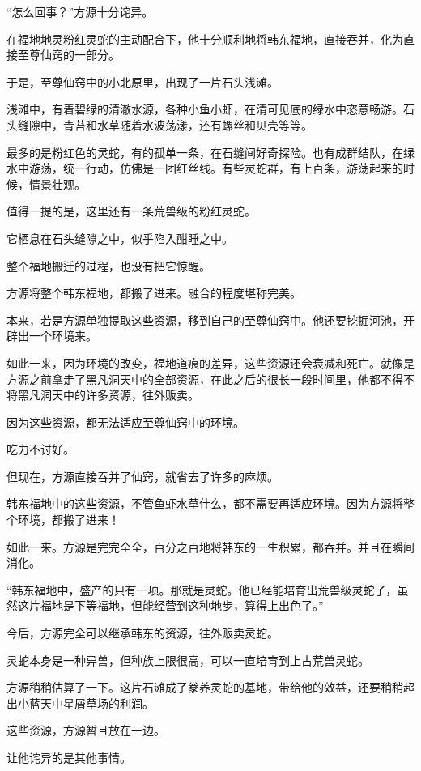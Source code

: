 
\begin{this_body}

“怎么回事？”方源十分诧异。

在福地地灵粉红灵蛇的主动配合下，他十分顺利地将韩东福地，直接吞并，化为直接至尊仙窍的一部分。

于是，至尊仙窍中的小北原里，出现了一片石头浅滩。

浅滩中，有着碧绿的清澈水源，各种小鱼小虾，在清可见底的绿水中恣意畅游。石头缝隙中，青苔和水草随着水波荡漾，还有螺丝和贝壳等等。

最多的是粉红色的灵蛇，有的孤单一条，在石缝间好奇探险。也有成群结队，在绿水中游荡，统一行动，仿佛是一团红丝线。有些灵蛇群，有上百条，游荡起来的时候，情景壮观。

值得一提的是，这里还有一条荒兽级的粉红灵蛇。

它栖息在石头缝隙之中，似乎陷入酣睡之中。

整个福地搬迁的过程，也没有把它惊醒。

方源将整个韩东福地，都搬了进来。融合的程度堪称完美。

本来，若是方源单独提取这些资源，移到自己的至尊仙窍中。他还要挖掘河池，开辟出一个环境来。

如此一来，因为环境的改变，福地道痕的差异，这些资源还会衰减和死亡。就像是方源之前拿走了黑凡洞天中的全部资源，在此之后的很长一段时间里，他都不得不将黑凡洞天中的许多资源，往外贩卖。

因为这些资源，都无法适应至尊仙窍中的环境。

吃力不讨好。

但现在，方源直接吞并了仙窍，就省去了许多的麻烦。

韩东福地中的这些资源，不管鱼虾水草什么，都不需要再适应环境。因为方源将整个环境，都搬了进来！

如此一来。方源是完完全全，百分之百地将韩东的一生积累，都吞并。并且在瞬间消化。

“韩东福地中，盛产的只有一项。那就是灵蛇。他已经能培育出荒兽级灵蛇了，虽然这片福地是下等福地，但能经营到这种地步，算得上出色了。”

今后，方源完全可以继承韩东的资源，往外贩卖灵蛇。

灵蛇本身是一种异兽，但种族上限很高，可以一直培育到上古荒兽灵蛇。

方源稍稍估算了一下。这片石滩成了豢养灵蛇的基地，带给他的效益，还要稍稍超出小蓝天中星屑草场的利润。

这些资源，方源暂且放在一边。

让他诧异的是其他事情。


\end{this_body}

